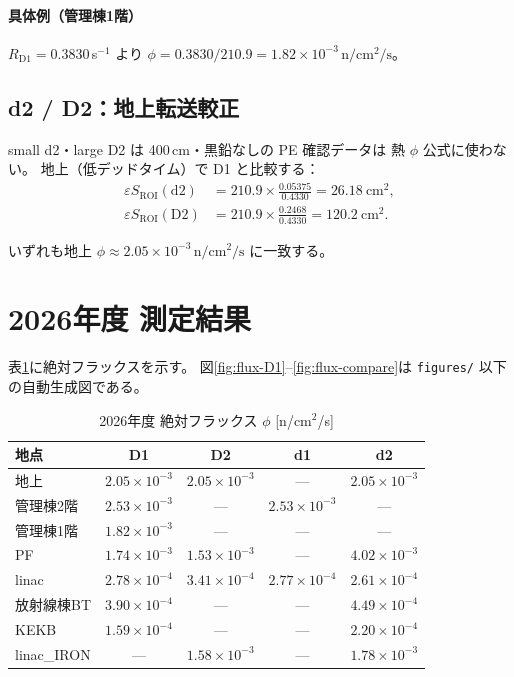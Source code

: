 \documentclass[a4paper,11pt]{ltjsarticle}
\begin{document}
\paragraph{具体例（管理棟1階）}
$R_\mathrm{D1}=0.3830$\,s$^{-1}$ より
$\phi = 0.3830/210.9 = 1.82\times10^{-3}\,\mathrm{n/cm^2/s}$。

\subsection{d2 / D2：地上転送較正}

small d2・large D2 は 400\,cm・黒鉛なしの PE 確認データは
熱 $\phi$ 公式に使わない。
地上（低デッドタイム）で D1 と比較する：
\begin{align}
  \varepsilon S_\mathrm{ROI}(\mathrm{d2})
  &= 210.9 \times \frac{0.05375}{0.4330} = 26.18\ \mathrm{cm^2}, \\
  \varepsilon S_\mathrm{ROI}(\mathrm{D2})
  &= 210.9 \times \frac{0.2468}{0.4330} = 120.2\ \mathrm{cm^2}.
\end{align}

いずれも地上 $\phi \approx 2.05\times10^{-3}\,\mathrm{n/cm^2/s}$ に一致する。

\section{2026年度 測定結果}

表\ref{tab:flux-all}に絶対フラックスを示す。
図\ref{fig:flux-D1}--\ref{fig:flux-compare}は
\texttt{figures/} 以下の自動生成図である。

\begin{table}[htbp]
  \centering
  \caption{2026年度 絶対フラックス $\phi$ [n/cm$^2$/s]}
  \label{tab:flux-all}
  \small
  \begin{tabular}{lcccc}
    \toprule
    地点 & D1 & D2 & d1 & d2 \\
    \midrule
    地上     & $2.05\times10^{-3}$ & $2.05\times10^{-3}$ & --- & $2.05\times10^{-3}$ \\
    管理棟2階 & $2.53\times10^{-3}$ & --- & $2.53\times10^{-3}$ & --- \\
    管理棟1階 & $1.82\times10^{-3}$ & --- & --- & --- \\
    PF       & $1.74\times10^{-3}$ & $1.53\times10^{-3}$ & --- & $4.02\times10^{-3}$ \\
    linac    & $2.78\times10^{-4}$ & $3.41\times10^{-4}$ & $2.77\times10^{-4}$ & $2.61\times10^{-4}$ \\
    放射線棟BT & $3.90\times10^{-4}$ & --- & --- & $4.49\times10^{-4}$ \\
    KEKB     & $1.59\times10^{-4}$ & --- & --- & $2.20\times10^{-4}$ \\
    linac\_IRON & --- & $1.58\times10^{-3}$ & --- & $1.78\times10^{-3}$ \\
    \bottomrule
  \end{tabular}
\end{table}
\end{document}
